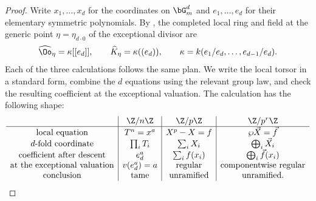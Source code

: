 \begin{proof}
Write $x_1,\dots,x_d$ for the coordinates on $\bG_m^d$ and
$e_1,\dots,e_d$ for their elementary symmetric polynomials. By
, the completed local ring and field at
the generic point $\eta=\eta_{d\cdot0}$ of the exceptional divisor are
\begin{equation}\label{eq:complete_field_at_generic_point}
    \widehat\Oo_\eta=\kappa[[e_d]],\qquad
    \widehat K_\eta=\kappa((e_d)),\qquad
    \kappa=k(e_1/e_d,\dots,e_{d-1}/e_d).
\end{equation}
Each of the three calculations follows the same plan. We write the local
torsor in a standard form, combine the $d$ equations using the relevant group
law, and check the resulting coefficient at the exceptional valuation. The
calculation has the following shape:
\[
\begin{array}{c|c|c|c}
 &\Z/n\Z&\Z/p\Z&\Z/p^r\Z\\ \hline
\text{local equation}&T^n=x^a&X^p-X=f&\wp\vec X=\vec f\\
\text{$d$-fold coordinate}&\prod_iT_i&\sum_iX_i&\bigoplus_i\vec X_i\\
\text{coefficient after descent}&e_d^a&\sum_i f(x_i)&\bigoplus_i\vec f(x_i)\\
\text{at the exceptional valuation}&v(e_d^a)=a&\text{regular}&
    \text{componentwise regular}\\
\text{conclusion}&\text{tame}&\text{unramified}&\text{unramified}.
\end{array}
\]


\end{proof}
